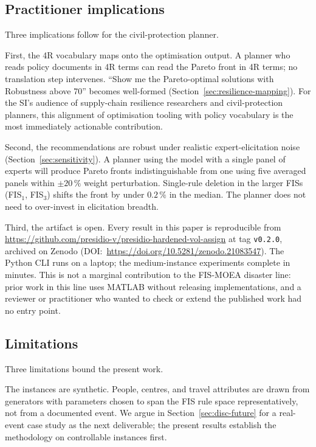 \documentclass[applsci,article,submit,moreauthors,pdftex]{Definitions/mdpi}
\begin{document}
\subsection{Practitioner implications}\label{sec:disc-practitioners}

Three implications follow for the civil-protection planner.

First, the 4R vocabulary maps onto the optimisation output. A planner who
reads policy documents in 4R terms can read the Pareto front in 4R terms;
no translation step intervenes. ``Show me the Pareto-optimal solutions
with Robustness above 70'' becomes well-formed
(Section~\ref{sec:resilience-mapping}). For the SI's audience of
supply-chain resilience researchers and civil-protection planners, this
alignment of optimisation tooling with policy vocabulary is the most
immediately actionable contribution.

Second, the recommendations are robust under realistic
expert-elicitation noise (Section~\ref{sec:sensitivity}). A planner using
the model with a single panel of experts will produce Pareto fronts
indistinguishable from one using five averaged panels within $\pm 20\,\%$
weight perturbation. Single-rule deletion in the larger FISs (FIS$_1$,
FIS$_3$) shifts the front by under $0.2\,\%$ in the median. The planner
does not need to over-invest in elicitation breadth.

Third, the artifact is open. Every result in this paper is reproducible
from \url{https://github.com/presidio-v/presidio-hardened-vol-assign} at tag
\texttt{v0.2.0}, archived on Zenodo (DOI:~\url{https://doi.org/10.5281/zenodo.21083547}).
The Python CLI
runs on a laptop; the medium-instance experiments complete in minutes.
This is not a marginal contribution to the FIS-MOEA disaster line: prior
work in this line \cite{rabiei2021, rabiei2023} uses MATLAB
without releasing implementations, and a reviewer or practitioner who
wanted to check or extend the published work had no entry point.

\subsection{Limitations}\label{sec:disc-limitations}

Three limitations bound the present work.

The instances are synthetic. People, centres, and travel attributes are
drawn from generators with parameters chosen to span the FIS rule space
representatively, not from a documented event. We argue in
Section~\ref{sec:disc-future} for a real-event case study as the next
deliverable; the present results establish the methodology on
controllable instances first.
\end{document}
